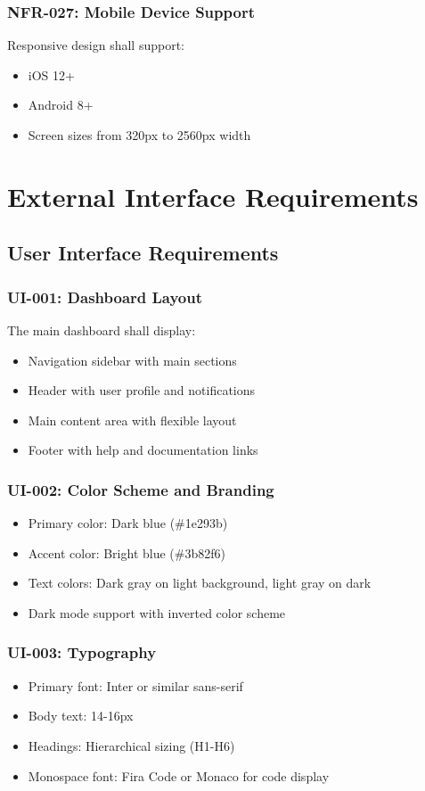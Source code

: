 \documentclass{report}
\begin{document}
\subsection{NFR-027: Mobile Device Support}
Responsive design shall support:
\begin{itemize}
    \item iOS 12+
    \item Android 8+
    \item Screen sizes from 320px to 2560px width
\end{itemize}

\chapter{External Interface Requirements}

\section{User Interface Requirements}

\subsection{UI-001: Dashboard Layout}
The main dashboard shall display:
\begin{itemize}
    \item Navigation sidebar with main sections
    \item Header with user profile and notifications
    \item Main content area with flexible layout
    \item Footer with help and documentation links
\end{itemize}

\subsection{UI-002: Color Scheme and Branding}
\begin{itemize}
    \item Primary color: Dark blue (\#1e293b)
    \item Accent color: Bright blue (\#3b82f6)
    \item Text colors: Dark gray on light background, light gray on dark
    \item Dark mode support with inverted color scheme
\end{itemize}

\subsection{UI-003: Typography}
\begin{itemize}
    \item Primary font: Inter or similar sans-serif
    \item Body text: 14-16px
    \item Headings: Hierarchical sizing (H1-H6)
    \item Monospace font: Fira Code or Monaco for code display
\end{itemize}
\end{document}
